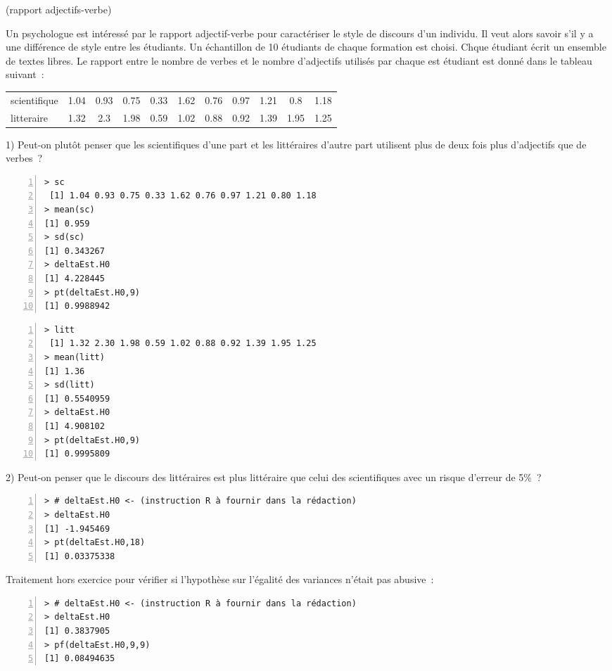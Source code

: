 \documentclass[10pt]{report}
\begin{document}
\begin{exercice} (rapport adjectifs-verbe)

Un psychologue est intéressé par le rapport adjectif-verbe pour caractériser le style de discours d'un individu. Il veut alors savoir s'il y a une différence de style entre les étudiants. Un échantillon de 10 étudiants de chaque formation est choisi. Chque étudiant écrit un ensemble de textes libres. Le rapport entre le nombre de verbes et le nombre d'adjectifs utilisés par chaque est étudiant est donné dans le tableau suivant~:

\begin{tabular}{|l|cccccccccc|}
\hline
scientifique&1.04& 0.93& 0.75& 0.33& 1.62& 0.76& 0.97& 1.21& 0.8 &1.18 \\
litteraire& 1.32& 2.3 & 1.98 &0.59& 1.02 &0.88& 0.92& 1.39 &1.95 &1.25 \\
\hline
\end{tabular}

1) Peut-on plutôt penser que les scientifiques d'une part et les littéraires d'autre part utilisent plus de deux fois plus d'adjectifs que de verbes~?

\IndicR
\begin{Verbatim}[frame=leftline,fontfamily=tt,fontshape=n,numbers=left]
> sc
 [1] 1.04 0.93 0.75 0.33 1.62 0.76 0.97 1.21 0.80 1.18
> mean(sc)
[1] 0.959
> sd(sc)
[1] 0.343267
> deltaEst.H0
[1] 4.228445
> pt(deltaEst.H0,9)
[1] 0.9988942
\end{Verbatim}
 
\begin{Verbatim}[frame=leftline,fontfamily=tt,fontshape=n,numbers=left]
> litt
 [1] 1.32 2.30 1.98 0.59 1.02 0.88 0.92 1.39 1.95 1.25
> mean(litt)
[1] 1.36
> sd(litt)
[1] 0.5540959
> deltaEst.H0
[1] 4.908102
> pt(deltaEst.H0,9)
[1] 0.9995809
\end{Verbatim}
 
 


2) Peut-on penser que le discours des littéraires est plus littéraire que celui des scientifiques avec un risque d'erreur de 5\%~?

\IndicR
\begin{Verbatim}[frame=leftline,fontfamily=tt,fontshape=n,numbers=left]
> # deltaEst.H0 <- (instruction R à fournir dans la rédaction)
> deltaEst.H0
[1] -1.945469
> pt(deltaEst.H0,18)
[1] 0.03375338
\end{Verbatim}

 



Traitement hors exercice pour v{\'e}rifier si l'hypoth{\`e}se sur l'{\'e}galit{\'e} des variances  n'{\'e}tait pas abusive~:

\IndicR
\begin{Verbatim}[frame=leftline,fontfamily=tt,fontshape=n,numbers=left]
> # deltaEst.H0 <- (instruction R à fournir dans la rédaction)
> deltaEst.H0
[1] 0.3837905
> pf(deltaEst.H0,9,9)
[1] 0.08494635
\end{Verbatim}

 


\end{exercice}
\end{document}
